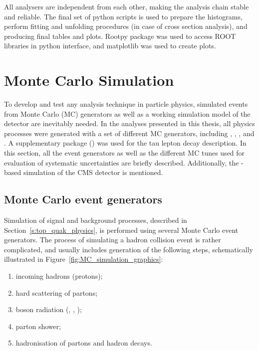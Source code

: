 All analysers are independent from each other, making the analysis chain stable and reliable. The final set of python
scripts is used to prepare the histograms, perform fitting and unfolding procedures (in case of cross section analysis),
and producing final tables and plots. Rootpy package \autocite{rootpy} was used to access ROOT libraries in python
interface, and matplotlib \autocite{matplotlib} was used to create plots.

\section{Monte Carlo Simulation}
\label{s:MC_simulation}

To develop and test any analysis technique in particle physics, simulated events from Monte Carlo (MC) generators as
well as a working simulation model of the detector are inevitably needed. In the analyses presented in this thesis, all
physics processes were generated with a set of different MC generators, including \MADGRAPH \autocite{MadGraph}, \PYTHIA
\autocite{Pythia,Pythia6.4}, \MCATNLO \autocite{MCatNLO}, and \POWHEG \autocite{POWHEG}. A supplementary package
(\TAUOLA \autocite{TAUOLA}) was used for the tau lepton decay description. In this section, all the event generators as
well as the different MC tunes used for evaluation of systematic uncertainties are briefly described. Additionally, the
\GEANTfour-based \autocite{GEANT4} simulation of the CMS detector is mentioned.

\subsection{Monte Carlo event generators}
\label{ss:MC_generators}
Simulation of \ttbar signal and background processes, described in Section~\ref{s:top_quak_physics}, is performed using
several Monte Carlo event generators. The process of simulating a hadron collision event is rather complicated, and
usually includes generation of the following steps, schematically illustrated in Figure~\ref{fig:MC_simulation_graphics}:

\begin{enumerate}[label=\textbullet]
  \item incoming hadrons (protons);
  \item hard scattering of partons;
  \item boson radiation (\Z, \photon, \cPg);
  \item parton shower;
  \item hadronisation of partons and hadron decays.
\end{enumerate}

